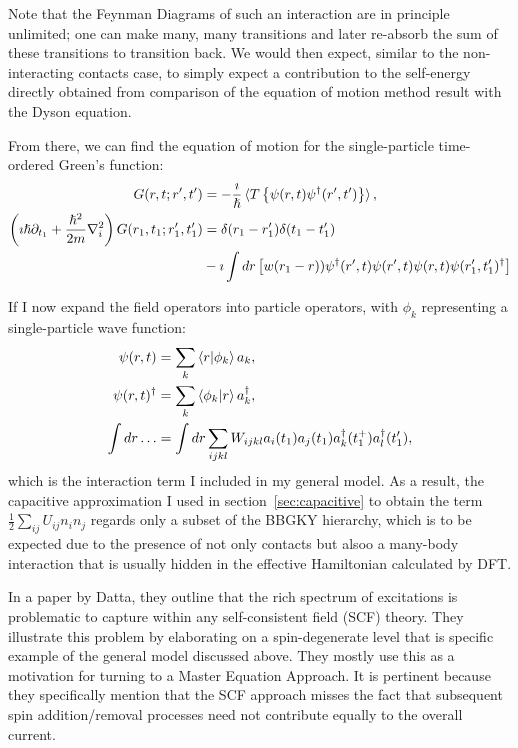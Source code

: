 Note that the Feynman Diagrams of such an interaction are in principle unlimited; one can make many, many transitions and later re-absorb the sum of these transitions to transition back. We would then expect, similar to the non\hyp{}interacting contacts case, to simply expect a contribution to the self-energy directly obtained from comparison of the equation of motion method result with the Dyson equation.

From there, we can find the equation of motion for the single-particle time-ordered Green's function:
\begin{align*}
G(r,t;r^\prime,t^\prime) &= -\frac{\imath}{\hslash}\braket{T \left\{ \psi(r,t) \psi^\dagger(r^\prime,t^\prime)\right\}}, \\
\left(\imath\hslash\partial_{t_1} + \frac{\hslash^2}{2m}\nabla_i^2\right) G(r_1, t_1; r_1^\prime, t_1^\prime) &= \delta(r_1 - r_1^\prime) \delta(t_1 - t_1^\prime) \\&- \imath \int dr\left[w(r_1 - r) ) \psi^\dagger (r^\prime, t) \psi(r^\prime,t) \psi(r,t) \psi(r_1^\prime, t_1^\prime)^\dagger\right]
\end{align*}

If I now expand the field operators into particle operators, with $\phi_k$ representing a single-particle wave function:
\begin{align*}
\psi(r, t) &= \sum_k \braket{r|\phi_k} a_k,\\
\psi(r, t)^\dagger &= \sum_k \braket{\phi_k|r} a_k^\dagger,\\
\int dr\ldots &= \int dr \sum_{ijkl} W_{ijkl} a_i(t_1) a_j (t_1) a_k^\dagger(t_1^+) a_l^\dagger(t_1^\prime),
\end{align*} which is the interaction term I included in my general model. As a result, the capacitive approximation I used in section~\ref{sec:capacitive} to obtain the term $\frac{1}{2} \sum_{ij} U_{ij} n_i n_j$ regards only a subset of the BBGKY hierarchy, which is to be expected due to the presence of not only contacts but alsoo a many-body interaction that is usually hidden in the effective Hamiltonian calculated by DFT.

In a paper by Datta\cite{mura}, they outline that the rich spectrum of excitations is problematic to capture within any self-consistent field (SCF) theory. They illustrate this problem by elaborating on a spin-degenerate level that is specific example of the general model discussed above. They mostly use this as a motivation for turning to a Master Equation Approach.  It is pertinent because they specifically mention that the SCF approach misses the fact that subsequent spin addition/removal processes need not contribute equally to the overall current.

